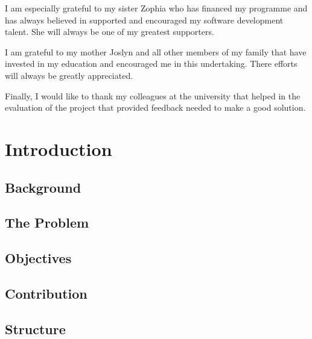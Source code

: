 \documentclass{mproj}
\begin{document}
I am especially grateful to my sister Zophia who has financed my programme and has always believed in supported and encouraged my software development talent. She will always be one of my greatest supporters.

I am grateful to my mother Joslyn and all other members of my family that have invested in my education and encouraged me in this undertaking. There efforts will always be greatly appreciated.

Finally, I would like to thank my colleagues at the university that helped in the evaluation of the project that provided feedback needed to make a good solution.

\tableofcontents




\chapter{Introduction}\label{intro}

\section{Background}

\section{The Problem}

\section{Objectives}

\section{Contribution}

\section{Structure}

\end{document}
